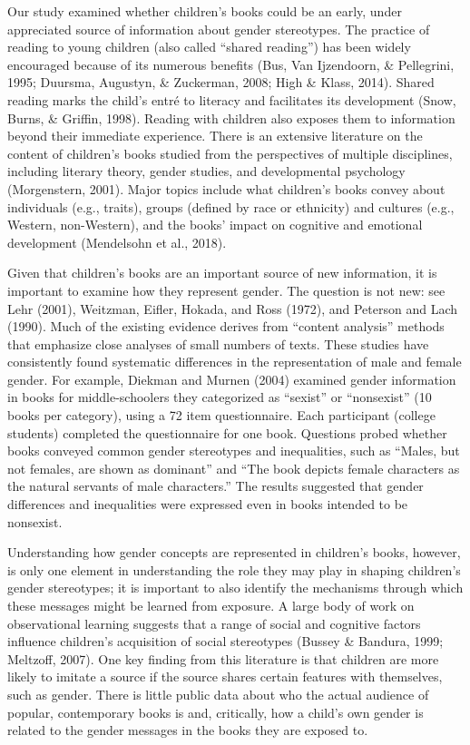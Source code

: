 \documentclass[english,,man,floatsintext]{apa6}
\begin{document}
Our study examined whether children's books could be an early, under appreciated source of information about gender stereotypes. The practice of reading to young children (also called \enquote{shared reading}) has been widely encouraged because of its numerous benefits (Bus, Van Ijzendoorn, \& Pellegrini, 1995; Duursma, Augustyn, \& Zuckerman, 2008; High \& Klass, 2014). Shared reading marks the child's entré to literacy and facilitates its development (Snow, Burns, \& Griffin, 1998). Reading with children also exposes them to information beyond their immediate experience. There is an extensive literature on the content of children's books studied from the perspectives of multiple disciplines, including literary theory, gender studies, and developmental psychology (Morgenstern, 2001). Major topics include what children's books convey about individuals (e.g., traits), groups (defined by race or ethnicity) and cultures (e.g., Western, non-Western), and the books' impact on cognitive and emotional development (Mendelsohn et al., 2018).

Given that children's books are an important source of new information, it is important to examine how they represent gender. The question is not new: see Lehr (2001), Weitzman, Eifler, Hokada, and Ross (1972), and Peterson and Lach (1990). Much of the existing evidence derives from \enquote{content analysis} methods that emphasize close analyses of small numbers of texts. These studies have consistently found systematic differences in the representation of male and female gender. For example, Diekman and Murnen (2004) examined gender information in books for middle-schoolers they categorized as \enquote{sexist} or \enquote{nonsexist} (10 books per category), using a 72 item questionnaire. Each participant (college students) completed the questionnaire for one book. Questions probed whether books conveyed common gender stereotypes and inequalities, such as \enquote{Males, but not females, are shown as dominant} and \enquote{The book depicts female characters as the natural servants of male characters.} The results suggested that gender differences and inequalities were expressed even in books intended to be nonsexist.

Understanding how gender concepts are represented in children's books, however, is only one element in understanding the role they may play in shaping children's gender stereotypes; it is important to also identify the mechanisms through which these messages might be learned from exposure. A large body of work on observational learning suggests that a range of social and cognitive factors influence children's acquisition of social stereotypes (Bussey \& Bandura, 1999; Meltzoff, 2007). One key finding from this literature is that children are more likely to imitate a source if the source shares certain features with themselves, such as gender. There is little public data about who the actual audience of popular, contemporary books is and, critically, how a child's own gender is related to the gender messages in the books they are exposed to.
\end{document}
